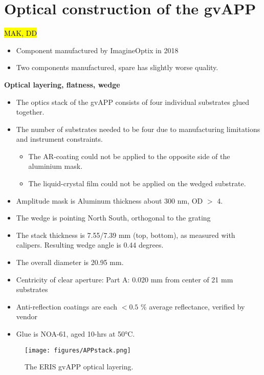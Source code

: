 \documentclass{aa}
\begin{document}
\section{Optical construction of the gvAPP}

\hl{MAK, DD}
\begin{itemize}
    \item Component manufactured by ImagineOptix in 2018
    \item Two components manufactured, spare has slightly worse quality.
\end{itemize}

\textbf{Optical layering, flatness, wedge}
\begin{itemize}
    \item The optics stack of the gvAPP consists of four individual substrates glued together.
    \item The number of substrates needed to be four due to manufacturing limitations and instrument constraints.
    \begin{itemize}
        \item The AR-coating could not be applied to the opposite side of the aluminium mask.
        \item The liquid-crystal film could not be applied on the wedged substrate.
    \end{itemize}
    \item Amplitude mask is Aluminum thickness about 300 nm, OD $>$ 4.
    \item The wedge is pointing North South, orthogonal to the grating
    \item The stack thickness is 7.55/7.39 mm (top, bottom), as measured with calipers. Resulting wedge angle is 0.44 degrees.
    \item The overall diameter is 20.95 mm.
    \item Centricity of clear aperture: Part A: 0.020 mm from center of 21 mm substrates
    \item Anti-reflection coatings are each $< 0.5$ \% average reflectance, verified by vendor
    \item Glue is NOA-61, aged 10-hrs at 50°C.
\end{itemize}



\begin{figure}
    \centering
    \texttt{[image: figures/APPstack.png]}
    \caption{The ERIS gvAPP optical layering.}
    \label{fig:optical_layering3}
\end{figure}
\end{document}
